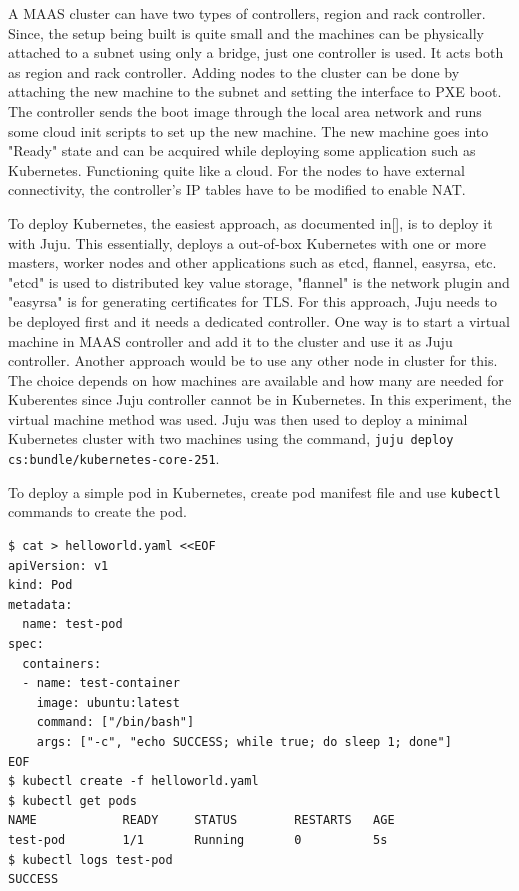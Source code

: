 \documentclass[english, 12pt, a4paper, elec, utf8, a-1b, online]{aaltothesis}
\begin{document}
A MAAS cluster can have two types of controllers, region and rack controller. Since, the setup being built is quite small and the machines can be physically attached to a subnet using only a bridge, just one controller is used. It acts both as region and rack controller. Adding nodes to the cluster can be done by attaching the new machine to the subnet and setting the interface to PXE boot. The controller sends the boot image through the local area network and runs some cloud init scripts to set up the new machine. The new machine goes into "Ready" state and can be acquired while deploying some application such as Kubernetes. Functioning quite like a cloud. For the nodes to have external connectivity, the controller's IP tables have to be modified to enable NAT.

To deploy Kubernetes, the easiest approach, as documented in[], is to deploy it with Juju. This essentially, deploys a out-of-box Kubernetes with one or more masters, worker nodes and other applications such as etcd, flannel, easyrsa, etc. "etcd" is used to distributed key value storage, "flannel" is the network plugin and "easyrsa" is for generating certificates for TLS. For this approach, Juju needs to be deployed first and it needs a dedicated controller. One way is to start a virtual machine in MAAS controller and add it to the cluster and use it as Juju controller. Another approach would be to use any other node in cluster for this. The choice depends on how machines are available and how many are needed for Kuberentes since Juju controller cannot be in Kubernetes. In this experiment, the virtual machine method was used. Juju was then used to deploy a minimal Kubernetes cluster with two machines using the command, \lstinline{juju deploy cs:bundle/kubernetes-core-251}.

To deploy a simple pod in Kubernetes, create pod manifest file and use \lstinline{kubectl} commands to create the pod.

\begin{lstlisting}[basicstyle={\small\ttfamily}]
$ cat > helloworld.yaml <<EOF
apiVersion: v1
kind: Pod
metadata:
  name: test-pod
spec:
  containers:
  - name: test-container
    image: ubuntu:latest
    command: ["/bin/bash"]
    args: ["-c", "echo SUCCESS; while true; do sleep 1; done"]
EOF
$ kubectl create -f helloworld.yaml
$ kubectl get pods
NAME            READY     STATUS        RESTARTS   AGE
test-pod        1/1       Running       0          5s
$ kubectl logs test-pod
SUCCESS
\end{lstlisting}
\end{document}

